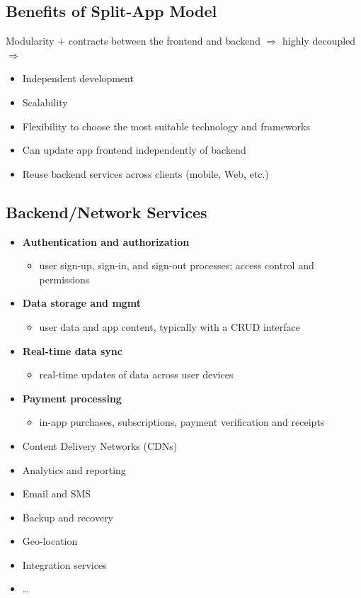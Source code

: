 \subsection{Benefits of Split-App Model}

\begin{propbox}
Modularity + contracts between the frontend and backend $\Rightarrow$ highly decoupled $\Rightarrow$
\begin{itemize}
  \item Independent development
  \item Scalability
  \item Flexibility to choose the most suitable technology and frameworks
  \item Can update app frontend independently of backend
  \item Reuse backend services across clients (mobile, Web, etc.)
\end{itemize}
\end{propbox}

\subsection{Backend/Network Services}

\begin{itemize}
  \item \textbf{Authentication and authorization}
  \begin{itemize}
    \item user sign-up, sign-in, and sign-out processes; access control and permissions
  \end{itemize}
  \item \textbf{Data storage and mgmt}
  \begin{itemize}
    \item user data and app content, typically with a CRUD interface
  \end{itemize}
  \item \textbf{Real-time data sync}
  \begin{itemize}
    \item real-time updates of data across user devices
  \end{itemize}
  \item \textbf{Payment processing}
  \begin{itemize}
    \item in-app purchases, subscriptions, payment verification and receipts
  \end{itemize}
  \item Content Delivery Networks (CDNs)
  \item Analytics and reporting
  \item Email and SMS
  \item Backup and recovery
  \item Geo-location
  \item Integration services
  \item \ldots
\end{itemize}

